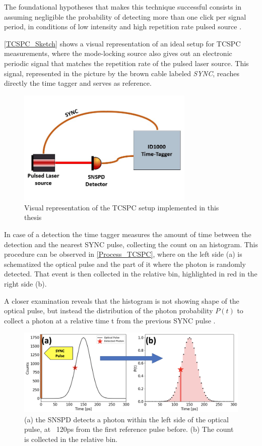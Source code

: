 The foundational hypotheses that makes this technique successful consists in assuming negligible the probability of detecting more than one click per signal period, in conditions of low intensity and high repetition rate pulsed source \cite{TCSPC_Bible}.

\autoref{TCSPC_Sketch} shows a visual representation of an ideal setup for TCSPC measurements, where the mode-locking source also gives out an electronic periodic signal that matches the repetition rate of the pulsed laser source. This signal, represented in the picture by the brown cable labeled \emph{SYNC}, reaches directly the time tagger and serves as reference.
\begin{figure}[hbtp]
\centering
\includegraphics[width=0.75\textwidth]{TCSPC_sketch}
\caption{Visual representation of the TCSPC setup implemented in this thesis}
\label{TCSPC_Sketch}
\end{figure}

In case of a detection the time tagger measures the amount of time between the detection and the nearest SYNC pulse, collecting the count on an histogram.
This procedure can be observed in \autoref{Process_TCSPC}, where on the left side (a) is schematized the optical pulse and the part of it where the photon is randomly detected. That event is then collected in the relative bin, highlighted in red in the right side (b). 

A closer examination reveals that the histogram is not showing shape of the optical pulse, but instead the distribution of the photon probability $P(t)$ to collect a photon at a relative time t from the previous SYNC pulse \cite{TCSPC_Bible}.

\begin{figure}[hbtp]
\centering
\includegraphics[width=1\textwidth]{TCSPC_Pulse_to_Hist3.jpg}
\caption{(a) the SNSPD detects a photon within the left side of the optical pulse, at ~120ps from the first reference pulse before. (b) The count is collected in the relative bin.}
\label{Process_TCSPC}
\end{figure}

